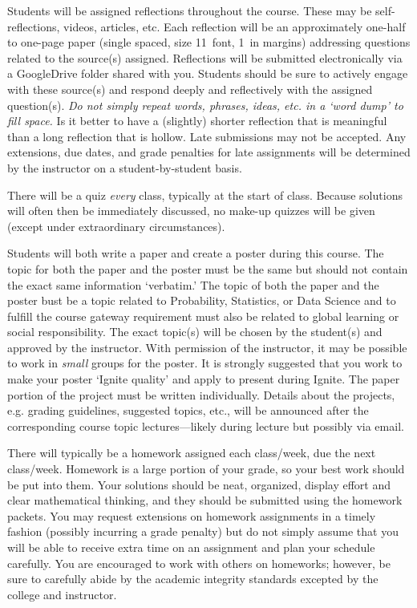 \documentclass[11pt,letterpaper]{article}
\begin{document}
Students will be assigned reflections throughout the course. These may be self-reflections, videos, articles, etc. Each reflection will be an approximately one-half to one-page paper (single spaced, size 11~font, 1~in margins) addressing questions related to the source(s) assigned. Reflections will be submitted electronically via a GoogleDrive folder shared with you. Students should be sure to actively engage with these source(s) and respond deeply and reflectively with the assigned question(s). \textit{Do not simply repeat words, phrases, ideas, etc. in a `word dump' to fill space.} Is it better to have a (slightly) shorter reflection that is meaningful than a long reflection that is hollow. Late submissions may not be accepted. Any extensions, due dates, and grade penalties for late assignments will be determined by the instructor on a student-by-student basis. \pspace 


There will be a quiz \textit{every} class, typically at the start of class. Because solutions will often then be immediately discussed, no make-up quizzes will be given (except under extraordinary circumstances). \pspace


Students will both write a paper and create a poster during this course. The topic for both the paper and the poster must be the same but should not contain the exact same information `verbatim.' The topic of both the paper and the poster bust be a topic related to Probability, Statistics, or Data Science and to fulfill the course gateway requirement must also be related to global learning or social responsibility. The exact topic(s) will be chosen by the student(s) and approved by the instructor. With permission of the instructor, it may be possible to work in \textit{small} groups for the poster. It is strongly suggested that you work to make your poster `Ignite quality' and apply to present during Ignite. The paper portion of the project must be written individually. Details about the projects, e.g. grading guidelines, suggested topics, etc., will be announced after the corresponding course topic lectures---likely during lecture but possibly via email. \pspace


There will typically be a homework assigned each class/week, due the next class/week. Homework is a large portion of your grade, so your best work should be put into them. Your solutions should be neat, organized, display effort and clear mathematical thinking, and they should be submitted using the homework packets. You may request extensions on homework assignments in a timely fashion (possibly incurring a grade penalty) but do not simply assume that you will be able to receive extra time on an assignment and plan your schedule carefully. You are encouraged to work with others on homeworks; however, be sure to carefully abide by the academic integrity standards excepted by the college and instructor. \pspace
\end{document}

